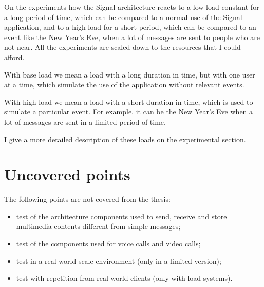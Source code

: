 On the experiments how the Signal architecture reacts to a low load constant for a long period of time, which can be compared to a normal use of the Signal application, and to a high load for a short period, which can be compared to an event like the New Year's Eve, when a lot of messages are sent to people who are not near.
All the experiments are scaled down to the resources that I could afford.

With base load we mean a load with a long duration in time, but with one user at a time, which simulate the use of the application without relevant events.

With high load we mean a load with a short duration in time, which is used to simulate a particular event. For example, it can be the New Year's Eve when a lot of messages are sent in a limited period of time.

I give a more detailed description of these loads on the experimental section.

\section{Uncovered points\label{sec:uncovered}}

The following points are not covered from the thesis:
\begin{itemize}
    \item test of the architecture components used to send, receive and store multimedia contents different from simple messages;
    \item test of the components used for voice calls and video calls;
    \item test in a real world scale environment (only in a limited version);
    \item test with repetition from real world clients (only with load systems).
\end{itemize}
